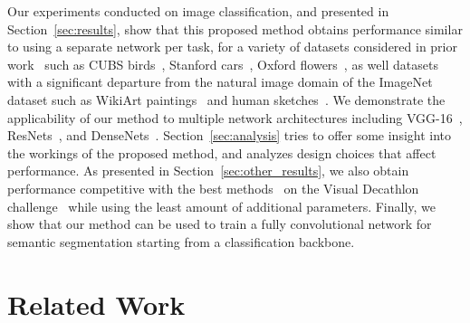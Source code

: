 \documentclass{llncs}
\begin{document}
Our experiments conducted on image classification, and presented in Section~\ref{sec:results}, show that this proposed method obtains performance similar to using a separate network per task, for a variety of datasets considered in prior work~\cite{mallya2017packnet} such as CUBS birds~\cite{WahCUB_200_2011}, Stanford cars~\cite{krause20133d}, Oxford flowers~\cite{Nilsback08}, as well 
datasets with a significant departure from the natural image domain of the ImageNet dataset such as WikiArt paintings~\cite{saleh2015large} and human sketches~\cite{eitz2012humans}. 
We demonstrate the applicability of our method to multiple network architectures including VGG-16~\cite{simonyan14VGG}, ResNets~\cite{he2016deep,zagoruyko2016wide}, and DenseNets~\cite{huang2017densely}.
Section~\ref{sec:analysis} tries to offer some insight into the workings of the proposed method, and analyzes design choices that affect performance.
As presented in Section~\ref{sec:other_results}, we also obtain performance competitive with the best methods~\cite{rosenfeld2017incremental} on the Visual Decathlon challenge~\cite{rebuffi2017learning} while using the least amount of additional parameters. Finally, we show that our method can be used to train a fully convolutional network for semantic segmentation starting from a classification backbone.

 

\section{Related Work}
\label{sec:related_work}
\end{document}

